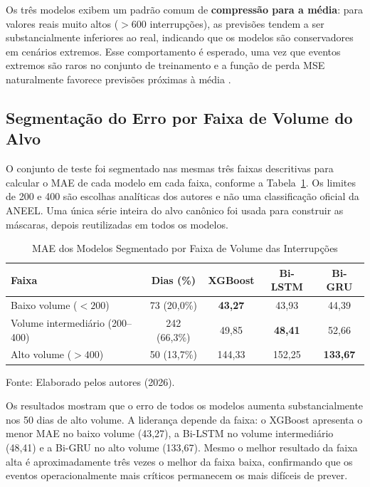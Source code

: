 Os três modelos exibem um padrão comum de \textbf{compressão para a média}: para valores reais muito altos ($>600$ interrupções), as previsões tendem a ser substancialmente inferiores ao real, indicando que os modelos são conservadores em cenários extremos. Esse comportamento é esperado, uma vez que eventos extremos são raros no conjunto de treinamento e a função de perda MSE naturalmente favorece previsões próximas à média \cite{goodfellow2016deep}.

\subsection{Segmentação do Erro por Faixa de Volume do Alvo}

O conjunto de teste foi segmentado nas mesmas três faixas descritivas para calcular o MAE de cada modelo em cada faixa, conforme a Tabela~\ref{tab:erro_faixa}. Os limites de 200 e 400 são escolhas analíticas dos autores e não uma classificação oficial da ANEEL. Uma única série inteira do alvo canônico foi usada para construir as máscaras, depois reutilizadas em todos os modelos.

\begin{table}[H]
\caption{MAE dos Modelos Segmentado por Faixa de Volume das Interrupções}
\label{tab:erro_faixa}
\begin{center}
\small
\begin{tabular}{lcccc}
\toprule
\textbf{Faixa} & \textbf{Dias (\%)} & \textbf{XGBoost} & \textbf{Bi-LSTM} & \textbf{Bi-GRU} \\
\midrule
Baixo volume ($< 200$) & 73 (20,0\%) & \textbf{43,27} & 43,93 & 44,39 \\
Volume intermediário (200--400) & 242 (66,3\%) & 49,85 & \textbf{48,41} & 52,66 \\
Alto volume ($> 400$) & 50 (13,7\%) & 144,33 & 152,25 & \textbf{133,67} \\
\bottomrule
\end{tabular}
\normalsize
\end{center}
\small{Fonte: Elaborado pelos autores (2026).}
\end{table}

Os resultados mostram que o erro de todos os modelos aumenta substancialmente nos 50 dias de alto volume. A liderança depende da faixa: o XGBoost apresenta o menor MAE no baixo volume (43,27), a Bi-LSTM no volume intermediário (48,41) e a Bi-GRU no alto volume (133,67). Mesmo o melhor resultado da faixa alta é aproximadamente três vezes o melhor da faixa baixa, confirmando que os eventos operacionalmente mais críticos permanecem os mais difíceis de prever.

